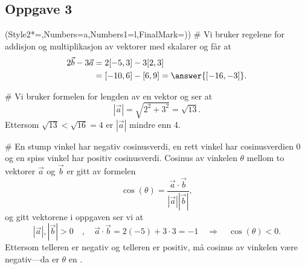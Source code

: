 \subsection*{Oppgave 3}
\begin{easylist}[enumerate]
	\ListProperties(Style2*=,Numbers=a,Numbers1=l,FinalMark={)})
	# Vi bruker regelene for addisjon og multiplikasjon av vektorer med skalarer og får at
	\begin{align*}
		2\vec{b}-3\vec{a} &= 2[-5, 3] - 3[2, 3]	\\
		&= [-10, 6]-[6, 9] = \answer{[-16, -3]}.
	\end{align*}
	
	
	# Vi bruker formelen for lengden av en vektor og ser at
	\begin{equation*}
		|\vec{a}| = \sqrt{2^2 + 3^2} = \sqrt{13}.
	\end{equation*}
	Ettersom $ \sqrt{13}<\sqrt{16}=4 $ er $ |\vec{a}| $ mindre enn 4.


	# En stump vinkel har negativ cosinusverdi, en rett vinkel har cosinusverdien 0 og en spiss vinkel har positiv cosinusverdi. 
	Cosinus av vinkelen $\theta$ mellom to vektorer $\vec{a}$ og $\vec{b}$ er gitt av formelen
	\begin{equation*}
		 \cos \left(  \theta \right) = \frac{\vec{a}\cdot\vec{b}}{|\vec{a}||\vec{b}|},
	\end{equation*}
	og gitt vektorene i oppgaven ser vi at
	\begin{equation*}
		|\vec{a}|, |\vec{b}| > 0\quad,\quad\vec{a}\cdot\vec{b}=2(-5)+3\cdot3=-1
		\quad \Rightarrow\quad
		 \cos \left(  \theta \right) <0.
	\end{equation*}
	Ettersom telleren er negativ og telleren er positiv, må cosinus av vinkelen være negativ---da er $\theta$ en .
\end{easylist}


